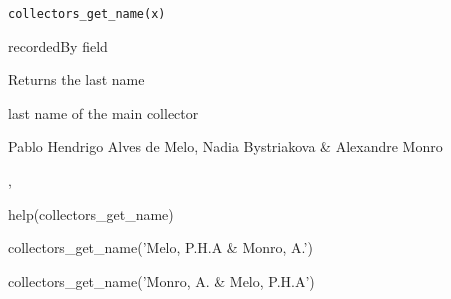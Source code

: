 \documentclass[a4paper]{book}
\begin{document}
%
\begin{Usage}
\begin{verbatim}
collectors_get_name(x)
\end{verbatim}
\end{Usage}
%
\begin{Arguments}
\begin{ldescription}
\item[\code{x}] recordedBy field
\end{ldescription}
\end{Arguments}
%
\begin{Details}
Returns the last name
\end{Details}
%
\begin{Value}
last name of the main collector
\end{Value}
%
\begin{Author}
Pablo Hendrigo Alves de Melo,
Nadia Bystriakova \&
Alexandre Monro
\end{Author}
%
\begin{SeeAlso}
, 
\end{SeeAlso}
%
\begin{Examples}
\begin{ExampleCode}

help(collectors_get_name)

collectors_get_name('Melo, P.H.A & Monro, A.')

collectors_get_name('Monro, A. & Melo, P.H.A')


\end{ExampleCode}
\end{Examples}
%
\end{document}

